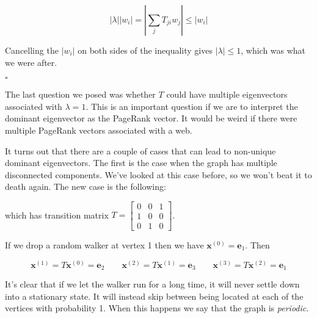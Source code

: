 \documentclass[12pt]{article}
\newcommand{\iter}[1]{^{\myp{#1}}}
\newcommand{\nin}{\noindent}
\newcommand{\vthree}{\vspace{3mm}}
\newcommand{\myp}[1]{\left( #1 \right)}
\newcommand{\myab}[1]{\left| #1 \right|}
\newcommand{\mymat}[1]{
\left[
\begin{array}{rrrrrrrrrrrrrrrrrrrrrrrrrrrrrrrrrrrrrrr}
#1
\end{array}
\right]
}
\newcommand{\bx}{\mathbf{x}}
\newcommand{\be}{\mathbf{e}}
\begin{document}
\[
\myab{\lambda} \myab{w_i} = \myab{\sum_j T_{ji} w_j} \leq \myab{w_i}
\]

\vthree

\nin Cancelling the $\myab{w_i}$ on both sides of the inequality gives $\myab{\lambda} \leq 1$, which was what we were after.

\hfill $\square$

\vthree

\nin The last question we posed was whether $T$ could have multiple eigenvectors associated with $\lambda = 1$.  This is an important question if we are to interpret the dominant eigenvector as the PageRank vector.  It would be weird if there were multiple PageRank vectors associated with a web.

\vthree

\nin It turns out that there are a couple of cases that can lead to non-unique dominant eigenvectors.  The first is the case when the graph has multiple disconnected components.  We've looked at this case before, so we won't beat it to death again.  The new case is the following:

\vthree

\begin{center}
\end{center}

\vthree

\nin which has transition matrix $T = \mymat{0 & 0 & 1 \\ 1 & 0 & 0 \\ 0 & 1 & 0}$.

\vthree

\nin If we drop a random walker at vertex 1 then we have $\bx\iter{0} = \be_1$.  Then

\[
\bx\iter{1} = T\bx\iter{0} = \be_2 \quad \quad
\bx\iter{2} = T\bx\iter{1} = \be_3 \quad \quad
\bx\iter{3} = T\bx\iter{2} = \be_1
\]

\vthree

\nin It's clear that if we let the walker run for a long time, it will never settle down into a stationary state.  It will instead skip between being located at each of the vertices with probability 1.  When this happens we say that the graph is {\it periodic}.
\end{document}
